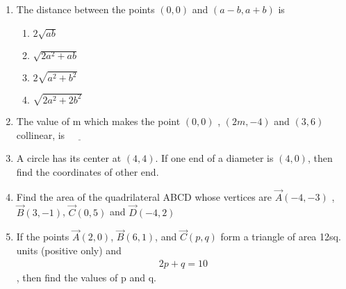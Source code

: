 \begin{enumerate}[label=\thesection.\arabic*.,ref=\thesection.\theenumi]
\item The distance between the points $(0,0)$ and $(a-b, a+b)$ is 
\begin{enumerate}
\item $2{\sqrt{ab}}$
\item $\sqrt{2a^2 + ab}$
\item $ 2\sqrt{a^2 + b^2}$
\item $ \sqrt{2a^2 + 2b^2}$
\end{enumerate}
\item The value of m which makes the point $(0,0)$ , $(2m, -4)$ and $(3,6)$ collinear, is $\underline{\hspace{1cm}}$
\item A circle has its center at $(4,4)$. If one end of a diameter is $(4,0)$, then find the coordinates of other end.
\item  Find the area of the quadrilateral ABCD whose vertices are $\vec A(-4, -3)$ , $\vec B(3, -1)$, $\vec C(0, 5)$ and $\vec D(-4, 2)$
\item If the points $\vec{A}(2,0)$, $\vec{B}(6,1)$, and $\vec{C}(p ,q)$ form a triangle of area 12sq. units (positive only) and \begin{align}2p + q = 10\end{align}, then find the values of p and q.
\end{enumerate}

